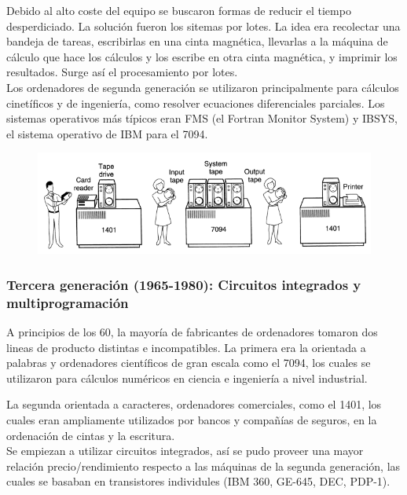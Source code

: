 \documentclass{article}
\begin{document}
Debido al alto coste del equipo se buscaron formas de reducir el tiempo desperdiciado. La solución fueron los sitemas por lotes. La idea era recolectar una bandeja de tareas, escribirlas en una cinta magnética, llevarlas a la máquina de cálculo que hace los cálculos y los escribe en otra cinta magnética, y imprimir los resultados. Surge así el procesamiento por lotes.\\

Los ordenadores de segunda generación se utilizaron principalmente para cálculos cinetíficos y de ingeniería, como resolver ecuaciones diferenciales parciales. Los sistemas operativos más típicos eran FMS (el Fortran Monitor System) y IBSYS, el sistema operativo de IBM para el 7094.

\begin{figure}[h]
\centering
\includegraphics[scale=1, width=\textwidth]{solotes.png}
\end{figure}

\subsubsection{Tercera generación (1965-1980): Circuitos integrados y multiprogramación}
A principios de los 60, la mayoría de fabricantes de ordenadores tomaron dos lineas de producto distintas e incompatibles. La primera era la orientada a palabras y ordenadores científicos de gran escala como el 7094, los cuales se utilizaron para cálculos numéricos en ciencia e ingeniería a nivel industrial.

La segunda orientada a caracteres, ordenadores comerciales, como el 1401, los cuales eran ampliamente utilizados por bancos y compañías de seguros, en la ordenación de cintas y la escritura.\\

Se empiezan a utilizar circuitos integrados, así se pudo proveer una mayor relación precio/rendimiento respecto a las máquinas de la segunda generación, las cuales se basaban en transistores individules (IBM 360, GE-645, DEC, PDP-1).\\
\end{document}
